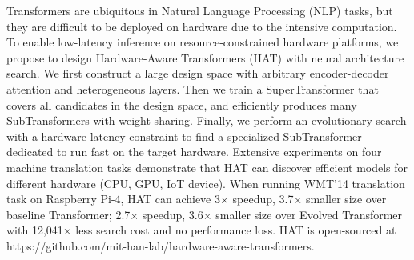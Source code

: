 Transformers are ubiquitous in Natural Language Processing (NLP) tasks, but they are difficult to be deployed on hardware due to the intensive computation. To enable low-latency inference on resource-constrained hardware platforms, we propose to design Hardware-Aware Transformers (HAT) with neural architecture search. We first construct a large design space with arbitrary encoder-decoder attention and heterogeneous layers. Then we train a SuperTransformer that covers all candidates in the design space, and efficiently produces many SubTransformers with weight sharing. Finally, we perform an evolutionary search with a hardware latency constraint to find a specialized SubTransformer dedicated to run fast on the target hardware. Extensive experiments on four machine translation tasks demonstrate that HAT can discover efficient models for different hardware (CPU, GPU, IoT device). When running WMT'14 translation task on Raspberry Pi-4, HAT can achieve 3× speedup, 3.7× smaller size over baseline Transformer; 2.7× speedup, 3.6× smaller size over Evolved Transformer with 12,041× less search cost and no performance loss. HAT is open-sourced at https://github.com/mit-han-lab/hardware-aware-transformers.
